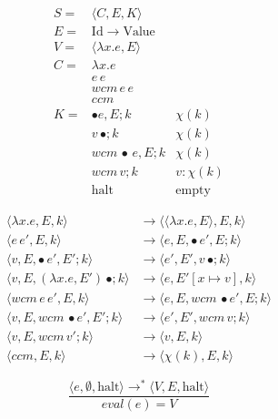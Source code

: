 \documentclass[ms]{byuprop}
\begin{document}
\begin{align*}
S= &\langle C,E,K\rangle\\
E= &\mathrm{Id}\rightarrow\mathrm{Value}\\
V= &\langle\lambda x.e,E\rangle\\
C= &\lambda x.e\\
   & e\,e\\
   & wcm\,e\,e\\
   & ccm\\
K= &\bullet e,E;k        & \chi(k)\\
   & v\,\bullet;k        & \chi(k)\\
   & wcm\,\bullet\,e,E;k & \chi(k)\\
   & wcm\,v; k           & v:\chi(k)\\
   & \mathrm{halt}       & \mathrm{empty}
\end{align*}

\begin{align*}
\langle\lambda x.e,E,k\rangle                  &\rightarrow \langle\langle\lambda x.e,E\rangle,E,k\rangle\\
\langle e\,e',E,k\rangle                       &\rightarrow\langle e,E,\bullet\,e',E;k\rangle\\
\langle v,E,\bullet\,e',E';k\rangle            &\rightarrow\langle e',E',v\,\bullet;k\rangle\\
\langle v,E,(\lambda x.e,E')\,\bullet;k\rangle &\rightarrow\langle e,E'[x\mapsto v],k\rangle\\
\langle wcm\,e\,e',E,k\rangle                  &\rightarrow\langle e,E,wcm\,\bullet e',E;k\rangle\\
\langle v,E,wcm\,\bullet e',E';k\rangle        &\rightarrow\langle e',E',wcm\,v;k\rangle\\
\langle v,E,wcm\,v';k\rangle                   &\rightarrow\langle v,E,k\rangle\\
\langle ccm,E,k\rangle                         &\rightarrow\langle\chi(k),E,k\rangle
\end{align*}

\[
\frac{\langle e,\emptyset,\mathrm{halt}\rangle\rightarrow^{*}\langle V,E,\mathrm{halt}\rangle}{eval(e)=V}
\]


\end{document}
